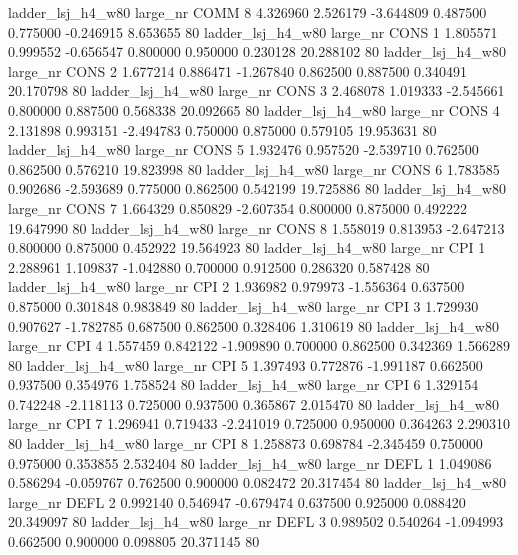   ladder_lsj_h4_w80   large_nr     COMM                 8  4.326960  2.526179  -3.644809 0.487500 0.775000 -0.246915    8.653655 80
  ladder_lsj_h4_w80   large_nr     CONS                 1  1.805571  0.999552  -0.656547 0.800000 0.950000  0.230128   20.288102 80
  ladder_lsj_h4_w80   large_nr     CONS                 2  1.677214  0.886471  -1.267840 0.862500 0.887500  0.340491   20.170798 80
  ladder_lsj_h4_w80   large_nr     CONS                 3  2.468078  1.019333  -2.545661 0.800000 0.887500  0.568338   20.092665 80
  ladder_lsj_h4_w80   large_nr     CONS                 4  2.131898  0.993151  -2.494783 0.750000 0.875000  0.579105   19.953631 80
  ladder_lsj_h4_w80   large_nr     CONS                 5  1.932476  0.957520  -2.539710 0.762500 0.862500  0.576210   19.823998 80
  ladder_lsj_h4_w80   large_nr     CONS                 6  1.783585  0.902686  -2.593689 0.775000 0.862500  0.542199   19.725886 80
  ladder_lsj_h4_w80   large_nr     CONS                 7  1.664329  0.850829  -2.607354 0.800000 0.875000  0.492222   19.647990 80
  ladder_lsj_h4_w80   large_nr     CONS                 8  1.558019  0.813953  -2.647213 0.800000 0.875000  0.452922   19.564923 80
  ladder_lsj_h4_w80   large_nr      CPI                 1  2.288961  1.109837  -1.042880 0.700000 0.912500  0.286320    0.587428 80
  ladder_lsj_h4_w80   large_nr      CPI                 2  1.936982  0.979973  -1.556364 0.637500 0.875000  0.301848    0.983849 80
  ladder_lsj_h4_w80   large_nr      CPI                 3  1.729930  0.907627  -1.782785 0.687500 0.862500  0.328406    1.310619 80
  ladder_lsj_h4_w80   large_nr      CPI                 4  1.557459  0.842122  -1.909890 0.700000 0.862500  0.342369    1.566289 80
  ladder_lsj_h4_w80   large_nr      CPI                 5  1.397493  0.772876  -1.991187 0.662500 0.937500  0.354976    1.758524 80
  ladder_lsj_h4_w80   large_nr      CPI                 6  1.329154  0.742248  -2.118113 0.725000 0.937500  0.365867    2.015470 80
  ladder_lsj_h4_w80   large_nr      CPI                 7  1.296941  0.719433  -2.241019 0.725000 0.950000  0.364263    2.290310 80
  ladder_lsj_h4_w80   large_nr      CPI                 8  1.258873  0.698784  -2.345459 0.750000 0.975000  0.353855    2.532404 80
  ladder_lsj_h4_w80   large_nr     DEFL                 1  1.049086  0.586294  -0.059767 0.762500 0.900000  0.082472   20.317454 80
  ladder_lsj_h4_w80   large_nr     DEFL                 2  0.992140  0.546947  -0.679474 0.637500 0.925000  0.088420   20.349097 80
  ladder_lsj_h4_w80   large_nr     DEFL                 3  0.989502  0.540264  -1.094993 0.662500 0.900000  0.098805   20.371145 80
